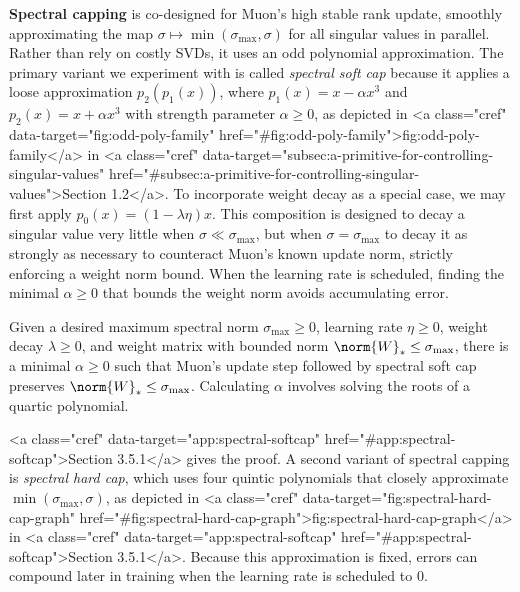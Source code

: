 \textbf{Spectral capping} is co-designed for Muon's high stable rank update, smoothly approximating the map $\sigma \mapsto \min(\sigma_\text{max}, \sigma)$ for all singular values in parallel. Rather than rely on costly SVDs, it uses an odd polynomial approximation. The primary variant we experiment with is called \textit{spectral soft cap} because it applies a loose approximation $p_2(p_1(x))$, where $p_1(x) = x - \alpha x^3$ and $p_2(x) = x + \alpha x^3$ with strength parameter $\alpha \geq 0$, as depicted in <a class="cref" data-target="fig:odd-poly-family" href="#fig:odd-poly-family">fig:odd-poly-family</a> in <a class="cref" data-target="subsec:a-primitive-for-controlling-singular-values" href="#subsec:a-primitive-for-controlling-singular-values">Section 1.2</a>. To incorporate weight decay as a special case, we may first apply $p_0(x) = (1 - \lambda \eta) x$. This composition is designed to decay a singular value very little when $\sigma \ll \sigma_\text{max}$, but when $\sigma = \sigma_\text{max}$ to decay it as strongly as necessary to counteract Muon's known update norm, strictly enforcing a weight norm bound. When the learning rate is scheduled, finding the minimal $\alpha \geq 0$ that bounds the weight norm avoids accumulating error.

\begin{theorembox}
    \label{thm:spectral-soft-cap-bound}
    Given a desired maximum spectral norm $\sigma_\text{max} \geq 0$, learning rate $\eta \geq 0$, weight decay $\lambda \geq 0$, and weight matrix with bounded norm $\norm{W}_\ast \leq \sigma_\text{max}$, there is a minimal $\alpha \geq 0$ such that Muon's update step followed by spectral soft cap preserves $\norm{W}_\ast \leq \sigma_\text{max}$. Calculating $\alpha$ involves solving the roots of a quartic polynomial.
\end{theorembox}

<a class="cref" data-target="app:spectral-softcap" href="#app:spectral-softcap">Section 3.5.1</a> gives the proof. A second variant of spectral capping is \textit{spectral hard cap}, which uses four quintic polynomials that closely approximate $\min(\sigma_\text{max}, \sigma)$, as depicted in <a class="cref" data-target="fig:spectral-hard-cap-graph" href="#fig:spectral-hard-cap-graph">fig:spectral-hard-cap-graph</a> in <a class="cref" data-target="app:spectral-softcap" href="#app:spectral-softcap">Section 3.5.1</a>. Because this approximation is fixed, errors can compound later in training when the learning rate is scheduled to $0$.

